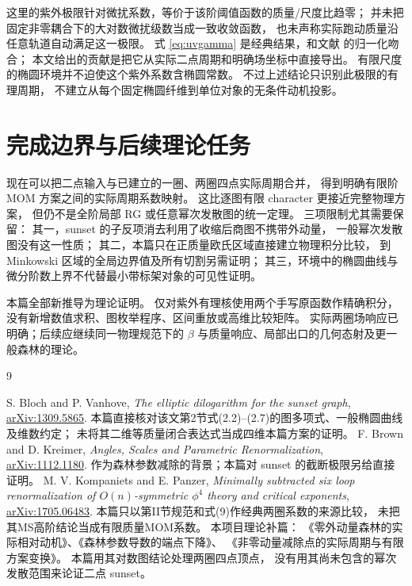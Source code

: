 \documentclass[11pt,a4paper]{ctexart}
\theoremstyle{cnplain}
\theoremstyle{remark}\newtheorem{remark}[theorem]{注}
\begin{document}
这里的紫外极限针对微扰系数，等价于该阶阈值函数的质量/尺度比趋零；
并未把固定非零耦合下的大对数微扰级数当成一致收敛函数，
也未声称实际跑动质量沿任意轨道自动满足这一极限。
式 \eqref{eq:uvgamma} 是经典结果，和文献
\cite[式(1)、(2)、(5)、(9)，$n=1$]{KP} 的归一化吻合；
本文给出的贡献是把它从实际二点周期和明确场坐标中直接导出。
有限尺度的椭圆环境并不迫使这个紫外系数含椭圆常数。
不过上述结论只识别此极限的有理周期，
不建立从每个固定椭圆纤维到单位对象的无条件动机投影。

\section{完成边界与后续理论任务}

现在可以把二点输入与已建立的一圈、两圈四点实际周期合并，
得到明确有限阶 MOM 方案之间的实际周期系数映射。
这比逐图有限 character 更接近完整物理方案，
但仍不是全阶局部 RG 或任意幂次发散图的统一定理。
三项限制尤其需要保留：
其一，sunset 的子反项消去利用了收缩后商图不携带外动量，
一般幂次发散图没有这一性质；
其二，本篇只在正质量欧氏区域直接建立物理积分比较，
到 Minkowski 区域的全局边界值及所有切割另需证明；
其三，环境中的椭圆曲线与微分阶数上界不代替最小带标架对象的可见性证明。

本篇全部新推导为理论证明。
仅对紫外有理核使用两个手写原函数作精确积分，
没有新增数值求积、图枚举程序、区间重放或高维比较矩阵。
实际两圈场响应已明确；后续应继续同一物理规范下的
$\beta$ 与质量响应、局部出口的几何态射及更一般森林的理论。

\begin{thebibliography}{9}\raggedright
{} S. Bloch and P. Vanhove,
\emph{The elliptic dilogarithm for the sunset graph},
\href{https://arxiv.org/abs/1309.5865}{arXiv:1309.5865}.
本篇直接核对该文第2节式(2.2)--(2.7)的图多项式、一般椭圆曲线及维数约定；
未将其二维等质量闭合表达式当成四维本篇方案的证明。
 F. Brown and D. Kreimer,
\emph{Angles, Scales and Parametric Renormalization},
\href{https://arxiv.org/abs/1112.1180}{arXiv:1112.1180}.
作为森林参数减除的背景；本篇对 sunset 的截断极限另给直接证明。
 M. V. Kompaniets and E. Panzer,
\emph{Minimally subtracted six loop renormalization of
$O(n)$-symmetric $\phi^4$ theory and critical exponents},
\href{https://arxiv.org/abs/1705.06483}{arXiv:1705.06483}.
本篇只以第II节规范和式(9)作经典两圈系数的来源比较，
未把其MS高阶结论当成有限质量MOM系数。
 本项目理论补篇：
《零外动量森林的实际相对动机》、《森林参数导数的端点下降》、
《非零动量减除点的实际周期与有限方案变换》。
本篇用其对数图结论处理两圈四点顶点，
没有用其尚未包含的幂次发散范围来论证二点 sunset。
\end{thebibliography}
\end{document}
